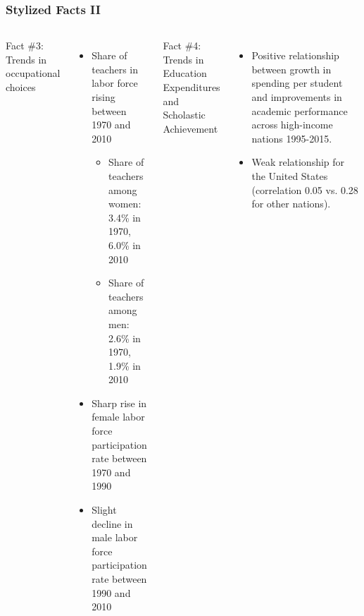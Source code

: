 \documentclass[11pt,hyperref={bookmarks=false},table,aspectratio=169]{beamer}
\begin{document}
\begin{frame}
\frametitle{Stylized Facts II}

\begin{columns}[t]
\alert{Fact \#3: Trends in occupational choices}
		\small{\begin{itemize}
			\item Share of teachers in labor force rising between 1970 and 2010
			\begin{itemize}
				\item Share of teachers among women: 3.4\% in 1970, 6.0\% in 2010
				\item Share of teachers among men: 2.6\% in 1970, 1.9\% in 2010
			\end{itemize}
			\item Sharp rise in female labor force participation rate between 1970 and 1990
			\item Slight decline in male labor force participation rate between 1990 and 2010
		\end{itemize}}
\alert{Fact \#4: Trends in Education Expenditures and Scholastic Achievement}
	\small{\begin{itemize}
		\item Positive relationship between growth in spending per student and improvements in academic performance across high-income nations 1995-2015.%
		\item Weak relationship for the United States\\(correlation 0.05 vs. 0.28 for other nations).
	\end{itemize}}
\end{columns}
\end{frame}
	
	
\end{document}
